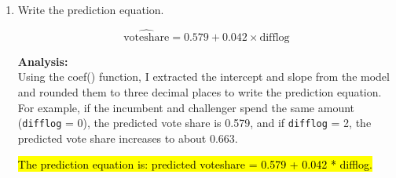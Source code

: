 \documentclass[12pt,letterpaper]{article}
\begin{document}
\begin{enumerate}
		\hl{The residuals are saved in the object residuals1, which represents the variation in the incumbent's vote share that is not explained by the difference in campaign spending.}
		
		\item Write the prediction equation.
		
		
		\[ \widehat{\text{voteshare}} = 0.579 + 0.042 \times \text{difflog} \]
		
		\textbf{Analysis:}\\
		Using the coef() function, I extracted the intercept and slope from the model and rounded them to three decimal places to write the prediction equation. For example, if the incumbent and challenger spend the same amount (\texttt{difflog} = 0), the predicted vote share is 0.579, and if \texttt{difflog} = 2, the predicted vote share increases to about 0.663.
		
		\hl{The prediction equation is: predicted voteshare = 0.579 + 0.042 * difflog.}
	\end{enumerate}
	
\newpage
\end{document}
